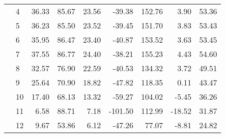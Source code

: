 \begin{table}
\begin{tabular}{l|l|rrrrrrr}
 & 4 & 36.33 & 85.67 & 23.56 & -39.38 & 152.76 & 3.90 & 53.36 \\
 & 5 & 36.23 & 85.50 & 23.52 & -39.45 & 151.70 & 3.83 & 53.43 \\
 & 6 & 35.95 & 86.47 & 23.40 & -40.87 & 153.52 & 3.63 & 53.45 \\
 & 7 & 37.55 & 86.77 & 24.40 & -38.21 & 155.23 & 4.43 & 54.60 \\
 & 8 & 32.57 & 76.90 & 22.59 & -40.53 & 134.32 & 3.72 & 49.51 \\
 & 9 & 25.64 & 70.90 & 18.82 & -47.82 & 118.35 & 0.11 & 43.47 \\
 & 10 & 17.40 & 68.13 & 13.32 & -59.27 & 104.02 & -5.45 & 36.26 \\
 & 11 & 6.58 & 88.71 & 7.18 & -101.50 & 112.99 & -18.52 & 31.87 \\
 & 12 & 9.67 & 53.86 & 6.12 & -47.26 & 77.07 & -8.81 & 24.82 \\
\cline{1-9}
\bottomrule
\end{tabular}
\end{table}
